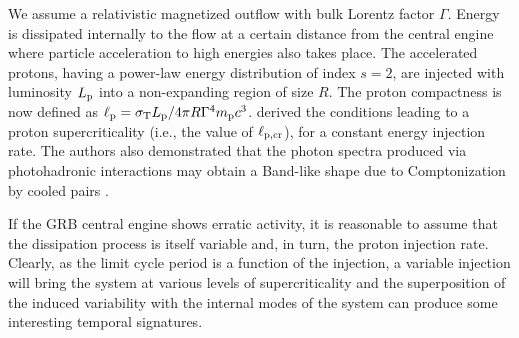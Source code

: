 \documentclass[fleqn,usenatbib]{mnras}
\newcommand{\sth}{\sigma_{\rm T}}
\newcommand{\lpcr}{\ell_{\rm p,cr}}
\newcommand{\mpr}{m_{\rm p}}
\begin{document}
{We assume a relativistic magnetized outflow with bulk Lorentz factor $\Gamma$. Energy is dissipated internally to the flow at a certain distance from the central engine where particle acceleration to high energies also takes place. The accelerated protons, having a power-law energy distribution of index $s=2$, are injected with luminosity $L_{\rm p}$ into a non-expanding region of size $R$.
The proton compactness is now defined as $\ell_{\rm p}=\sth L_{\rm p}/4\pi R \Gamma^4 \mpr c^3$.  \cite{pdmg14} derived the conditions leading to a proton supercriticality (i.e., the value of $\lpcr$), for a constant energy injection rate. The authors also demonstrated that the photon spectra produced via photohadronic interactions may obtain a Band-like shape due to Comptonization by cooled pairs \citep[for the role of Comptonization in hadronic scenarios, see also][]{murase12}. 

If the GRB central engine shows erratic activity, it is reasonable to assume that the dissipation process is itself variable and, in turn, the proton injection rate. Clearly, as the limit cycle period is a function of the injection, a variable injection will bring the system at various levels of supercriticality  and the superposition of the induced variability with the internal modes of the system can produce some interesting temporal signatures. 

}
\end{document}
